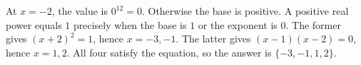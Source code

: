 At $x=-2$, the value is $0^{12}=0$. Otherwise the base is positive. A positive real power equals $1$ precisely when the base is $1$ or the exponent is $0$. The former gives $(x+2)^2=1$, hence $x=-3,-1$. The latter gives $(x-1)(x-2)=0$, hence $x=1,2$. All four satisfy the equation, so the answer is $\boxed{\{-3,-1,1,2\}}$.
